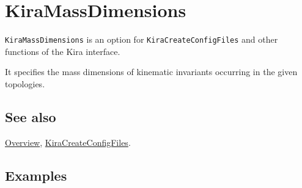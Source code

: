 \documentclass[../FeynHelpersManual.tex]{subfiles}
\begin{document}
\hypertarget{kiramassdimensions}{
\section{KiraMassDimensions}\label{kiramassdimensions}}

\texttt{KiraMassDimensions} is an option for
\texttt{KiraCreateConfigFiles} and other functions of the Kira
interface.

It specifies the mass dimensions of kinematic invariants occurring in
the given topologies.

\subsection{See also}

\hyperlink{toc}{Overview},
\hyperlink{kiracreateconfigfiles}{KiraCreateConfigFiles}.

\subsection{Examples}
\end{document}
